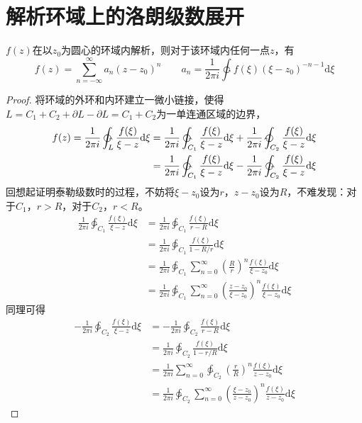 \documentclass[10pt, a4paper, oneside]{ctexbook}
\def\D{\mathrm{d}}
\newcommand{\F}[1][z]
{\ensuremath{f(#1)}}
\begin{document}
\section{解析环域上的洛朗级数展开}
$\F$在以$z_0$为圆心的环域内解析，则对于该环域内任何一点$z$，有
$$
\F = \sum_{n=-\infty}^\infty a_n (z-z_0)^n\quad\quad a_n=\frac{1}{2\pi i} \ointctrclockwise \F[\xi](\xi-z_0)^{-n-1}\D \xi
$$
\begin{proof}
    将环域的外环和内环建立一微小链接，使得$L=C_1+C_2+\partial L - \partial L = C_1+C_2$为一单连通区域的边界，
    \begin{align*}
        \F = \frac{1}{2\pi i} \ointctrclockwise_L \frac{\F[\xi]}{\xi-z}\D \xi=\frac{1}{2\pi i} \ointctrclockwise_{C_1} \frac{\F[\xi]}{\xi-z}\D \xi+\frac{1}{2\pi i} \ointclockwise_{C_2} \frac{\F[\xi]}{\xi-z}\D \xi\\
        = \frac{1}{2\pi i} \ointctrclockwise_{C_1} \frac{\F[\xi]}{\xi-z}\D \xi -\frac{1}{2\pi i} \ointctrclockwise_{C_2} \frac{\F[\xi]}{\xi-z}\D \xi\\
    \end{align*}
    回想起证明泰勒级数时的过程，不妨将$\xi-z_0$设为$r$，$z-z_0$设为$R$，不难发现：对于$C_1$，$r>R$，对于$C_2$，$r<R$。
    \begin{align*}
        \frac{1}{2\pi i} \ointctrclockwise_{C_1} \frac{\F[\xi]}{\xi-z}\D \xi 
         &= \frac{1}{2\pi i} \ointctrclockwise_{C_1} \frac{\F[\xi]}{r-R}\D \xi \\
         &= \frac{1}{2\pi i} \ointctrclockwise_{C_1} \frac{\F[\xi]}{1-R/r}\D \xi\\
         &=\frac{1}{2\pi i} \ointctrclockwise_{C_1} \sum_{n=0}^\infty \left(\frac{R}{r}\right)^n  \frac{\F[\xi]}{\xi-z_0} \D \xi \\
         &=\frac{1}{2\pi i} \ointctrclockwise_{C_1} \sum_{n=0}^\infty  \left(\frac{z-z_0}{\xi-z_0}\right)^n  \frac{\F[\xi]}{\xi-z_0} \D \xi
    \end{align*}
    同理可得
    \begin{align*}
        -\frac{1}{2\pi i} \ointctrclockwise_{C_2} \frac{\F[\xi]}{\xi-z}\D \xi 
        &= -\frac{1}{2\pi i} \ointctrclockwise_{C_2} \frac{\F[\xi]}{r-R}\D \xi \\
        &= \frac{1}{2\pi i} \ointctrclockwise_{C_2} \frac{\F[\xi]}{1-r/R}\D \xi\\
        &=\frac{1}{2\pi i} \sum_{n=0}^\infty \ointctrclockwise_{C_2} \left(\frac{r}{R}\right)^n  \frac{\F[\xi]}{z-z_0} \D \xi \\
        &= \frac{1}{2\pi i} \ointctrclockwise_{C_2} \sum_{n=0}^\infty \left(\frac{\xi-z_0}{z-z_0}\right)^n  \frac{\F[\xi]}{z-z_0} \D \xi

\end{align*}
\end{proof}
\end{document}
